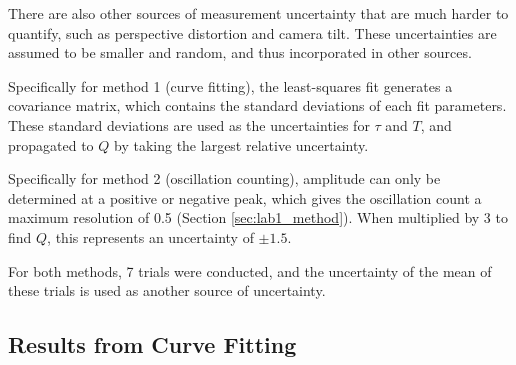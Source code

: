 \documentclass[aps,twocolumn,secnumarabic,nobalancelastpage,amsmath,amssymb,nofootinbib,floatfix,letterpaper]{revtex4}
\begin{document}
There are also other sources of measurement uncertainty that are much harder to quantify, such as perspective
distortion and camera tilt. These uncertainties are assumed to be smaller and random, and thus incorporated in other
sources.

Specifically for method 1 (curve fitting), the least-squares fit generates a covariance matrix, which contains the
standard deviations of each fit parameters. These standard deviations are used as the uncertainties for \(\tau\) and
\(T\), and propagated to \(Q\) by taking the largest relative uncertainty.

Specifically for method 2 (oscillation counting), amplitude can only be determined at a positive or negative peak, which
gives the oscillation count a maximum resolution of 0.5 (Section \ref{sec:lab1_method}). When multiplied by 3 to find
\(Q\), this represents an uncertainty of \(\pm 1.5\).

For both methods, 7 trials were conducted, and the uncertainty of the mean of these trials is used as another source of
uncertainty.

\subsection{Results from Curve Fitting}
\end{document}
